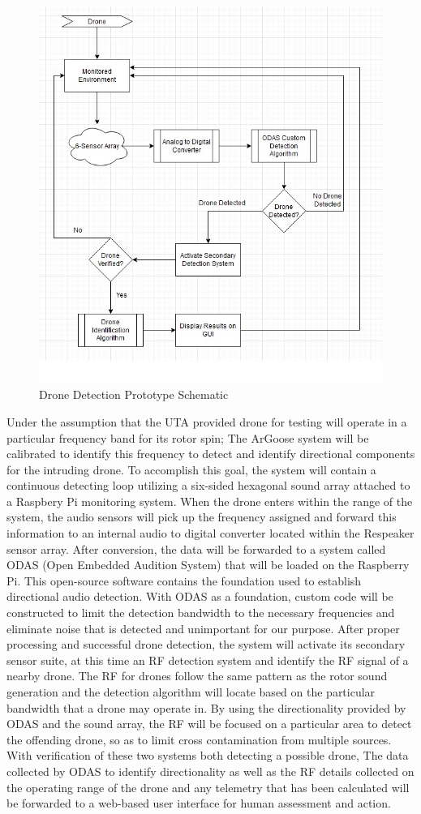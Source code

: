 ﻿\begin{figure}[h!]
    \centering
    \includegraphics[width=.75\textwidth]{images/drone.jpg}
    \caption{Drone Detection Prototype Schematic}
\end{figure}
Under the assumption that the UTA provided drone for testing will operate in a particular frequency band for its rotor spin; The ArGoose system will be calibrated to identify this frequency to detect and identify directional components for the intruding drone. To accomplish this goal, the system will contain a continuous detecting loop utilizing a six-sided hexagonal sound array attached to a Raspbery Pi monitoring system. When the drone enters within the range of the system, the audio sensors will pick up the frequency assigned and forward this information to an internal audio to digital converter located within the Respeaker sensor array. After conversion, the data will be forwarded to a system called ODAS (Open Embedded Audition System) that will be loaded on the Raspberry Pi. This open-source software contains the foundation used to establish directional audio detection. With ODAS as a foundation, custom code will be constructed to limit the detection bandwidth to the necessary frequencies and eliminate noise that is detected and unimportant for our purpose. After proper processing and successful drone detection, the system will activate its secondary sensor suite, at this time an RF detection system and identify the RF signal of a nearby drone. The RF for drones follow the same pattern as the rotor sound generation and the detection algorithm will locate based on the particular bandwidth that a drone may operate in. By using the directionality provided by ODAS and the sound array, the RF will be focused on a particular area to detect the offending drone, so as to limit cross contamination from multiple sources. With verification of these two systems both detecting a possible drone, The data collected by ODAS to identify directionality as well as the RF details collected on the operating range of the drone and any telemetry that has been calculated will be forwarded to a web-based user interface for human assessment and action.